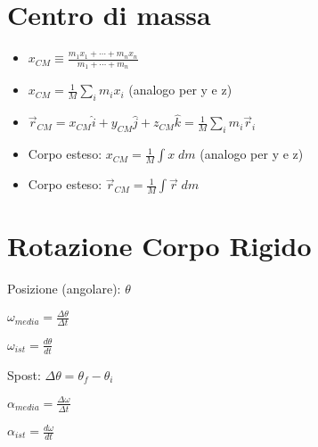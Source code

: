 \documentclass[a4paper,14pt,landscape]{extarticle}
\begin{document}
\begin{multicols*}{2}
    \section*{Centro di massa}
    \begin{itemize}
        \item $x_{CM} \equiv \tfrac{m_1x_1 + \cdots + m_nx_n}{m_1 + \cdots + m_n}$
        \item $x_{CM} = \tfrac{1}{M}\sum_i m_ix_i$ (analogo per y e z)
        \item $\vec{r}_{CM} = x_{CM}\hat{i} + y_{CM}\hat{j} + z_{CM}\hat{k} = \tfrac{1}{M} \sum_i m_i \vec{r}_i$
        \item Corpo esteso: $x_{CM} = \tfrac{1}{M} \int x \; dm$ (analogo per y e z)
        \item Corpo esteso: $\vec{r}_{CM} = \frac{1}{M} \int \vec{r} \; dm$
    \end{itemize}

    \section*{Rotazione Corpo Rigido}
    \begin{itemize}

        \begin{multicols*}{2}
            \item Posizione (angolare): $\theta$
            \item $\omega_{media} = \tfrac{\Delta \theta}{\Delta t}$
            \item $\omega_{ist} = \tfrac{d \theta}{d t}$
            \item Spost: $\Delta \theta = \theta_f - \theta_i$
            \item $\alpha_{media} = \tfrac{\Delta \omega}{\Delta t}$
            \item $\alpha_{ist} = \tfrac{d \omega}{d t}$
        \end{multicols*}
    \end{itemize}


\end{multicols*}
\end{document}
